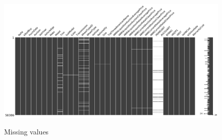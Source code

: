 \documentclass{article}
\begin{document}
	\begin{figure}[]
		\centering
		{\includegraphics[width=.9\textwidth, height=.8\textheight, keepaspectratio]{missingv.png}}
		\caption{{ Missing values }}
		\label{fig:missingval}
	\end{figure}
	
\end{document}
